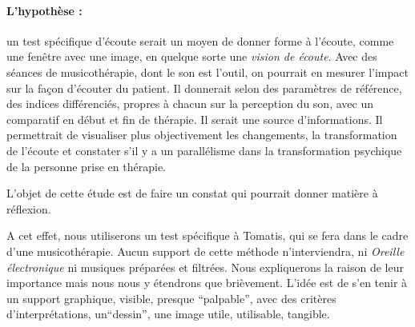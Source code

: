 \paragraph{\textbf{L'hypothèse }: } un test spécifique d'écoute serait  un 
moyen de donner  forme à l'écoute, comme une fenêtre avec une  image, en quelque sorte une \emph{vision de écoute}. Avec  des séances de musicothérapie, dont  le son est l'outil, on pourrait en mesurer l'impact sur la façon d'écouter du patient. 
Il  donnerait selon des paramètres de référence, des indices différenciés, propres à chacun sur la perception du son, avec un comparatif en début et fin de thérapie. Il serait  une source d'informations. Il permettrait de visualiser plus objectivement
les changements, la transformation de l'écoute et constater s'il y a un parallélisme dans la transformation psychique  de la personne prise en thérapie.


 L'objet de cette étude est de faire un constat
qui pourrait donner matière à réflexion.

A cet effet, nous utiliserons un test spécifique à Tomatis, qui se fera dans le cadre d'une musicothérapie. Aucun support de cette méthode n'interviendra, ni \textit{\textsl{Oreille
électronique}} ni musiques préparées et filtrées. Nous expliquerons la raison de   leur importance mais nous nous y étendrons que brièvement. L'idée est de s'en tenir à un support
graphique, visible, presque ``palpable'', avec des critères
d'interprétations, un``dessin'', une image utile,
utilisable, tangible.


